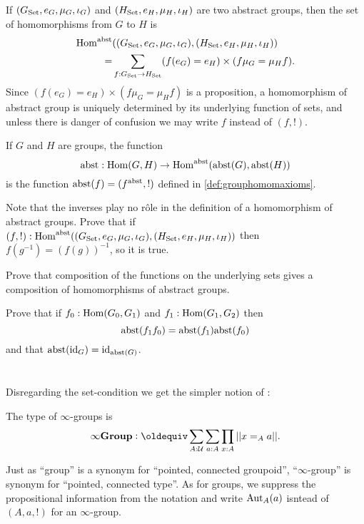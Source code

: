 \begin{definition}\label{def:abstrisfunctor}
  If $(G_{\mathord{\mathrm{Set}}},e_G,\mu_G,\iota_G)$ and $(H_{\mathord{\mathrm{Set}}},e_H,\mu_H,\iota_H)$ are two abstract groups, then the set of homomorphisms from $G$ to $H$ is
  \begin{align*}
    \mathrm{Hom}^{\mathrm{abst}}&((G_{\mathord{\mathrm{Set}}},e_G,\mu_G,\iota_G),(H_{\mathord{\mathrm{Set}}},e_H,\mu_H,\iota_H))\\
=&\sum_{f:G_{\mathord{\mathrm{Set}}}\to H_{\mathord{\mathrm{Set}}}}(f(e_G)=e_H)\times (f\mu_G=\mu_Hf).
  \end{align*} 
Since $(f(e_G)=e_H)\times (f\mu_G=\mu_Hf)$ is a proposition, a homomorphism of abstract group is uniquely determined by its underlying function of sets, and unless there is danger of confusion we may write $f$ instead of $(f,!)$. 

If $G$ and $H$ are groups, the function
$$\mathrm{abst}:\mathrm{Hom}(G,H)\to\mathrm{Hom}^{\mathrm{abst}}(\mathrm{abst}(G),\mathrm{abst}(H))$$
is the function $\mathrm{abst}(f)=(f^{\mathrm{abst}},!)$ defined in \cref{def:grouphomomaxioms}.
\end{definition}
\begin{xca}
  Note that the inverses play no r\^ole in the definition of a homomorphism of abstract groups.  Prove that if $(f,!):\mathrm{Hom}^{\mathrm{abst}}((G_{\mathord{\mathrm{Set}}},e_G,\mu_G,\iota_G),(H_{\mathord{\mathrm{Set}}},e_H,\mu_H,\iota_H))$ then $f(g^{-1})=(f(g))^{-1}$, so it is true.
\end{xca}
\begin{xca}
Prove that composition of the functions on the underlying sets gives a composition of homomorphisms of abstract groups.

  Prove that if $f_0:\mathrm{Hom}(G_0,G_1)$ and $f_1:\mathrm{Hom}(G_1,G_2)$ then 
$$\mathrm{abst}(f_1f_0)=\mathrm{abst}(f_1)\mathrm{abst}(f_0)$$ and that $\mathrm{abst}(\mathord{\mathrm{id}}_G)=\mathord{\mathrm{id}}_{\mathrm{abst}(G)}$.
\end{xca}



\section{\inftygps}
\label{sec:inftygps}

Disregarding the set-condition we get the simpler notion of \inftygps:
\begin{definition}The type of $\infty$-groups is
  $$\typeinftygp\defequi \sum_{A:\UU}\sum_{a:A}\prod_{x:A}||x=_Aa||.$$
\end{definition}

\begin{remark}\label{rem:pointedtypes}
  Just as ``group'' is a synonym for ``pointed, connected groupoid'', ``$\infty$-group'' is synonym for ``pointed, connected type''.  As for groups, we suppress the propositional information from the notation and write $\mathrm{Aut}_A(a)$ isntead of $(A,a,!)$ for an $\infty$-group.
\end{remark}


